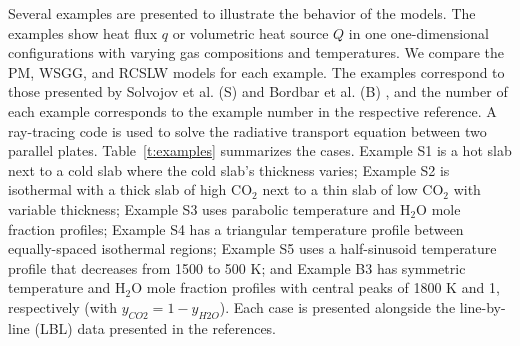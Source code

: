 \documentclass[preprint,12pt, a4paper]{elsarticle}
\begin{document}
Several examples are presented to illustrate the behavior of the models. The examples show heat flux $q$ or volumetric heat source $Q$ in one one-dimensional configurations with varying gas compositions and temperatures. We compare the PM, WSGG, and RCSLW models for each example. The examples correspond to those presented by Solvojov et al. (S) \cite{Solovjov_2017} and Bordbar et al. (B) \cite{Bordbar_2020}, and the number of each example corresponds to the example number in the respective reference. A ray-tracing code is used to solve the radiative transport equation between two parallel plates. 
Table~\ref{t:examples} summarizes the cases. Example S1 is a hot slab next to a cold slab where the cold slab's thickness varies; Example S2 is isothermal with a thick slab of high CO$_2$ next to a thin slab of low CO$_2$ with variable thickness; Example S3 uses parabolic temperature and H$_2$O mole fraction profiles; Example S4 has a triangular temperature profile between equally-spaced isothermal regions; Example S5 uses a half-sinusoid temperature profile that decreases from 1500 to 500 K; and Example B3 has symmetric temperature and H$_2$O mole fraction profiles with central peaks of 1800 K and 1, respectively (with $y_{CO2}=1-y_{H2O}$). Each case is presented alongside the line-by-line (LBL) data presented in the references. 
%
\end{document}
